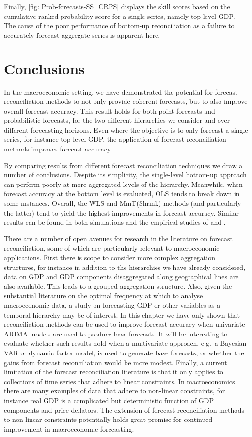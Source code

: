\documentclass[graybox]{svmult}
\begin{document}
Finally, \autoref{fig: Prob-forecasts-SS_CRPS} displays the skill scores based on the cumulative ranked probability score for a single series, namely top-level GDP\@. The cause of the poor performance of bottom-up reconciliation as a failure to accurately forecast aggregate series is apparent here.

\section{Conclusions}\label{sec:conclusions}

In the macroeconomic setting, we have demonstrated the potential for forecast reconciliation methods to not only provide coherent forecasts, but to also improve overall forecast accuracy. This result holds for both point forecasts and probabilistic forecasts, for the two different hierarchies we consider and over different forecasting horizons. Even where the objective is to only forecast a single series, for instance top-level GDP, the application of forecast reconciliation methods improves forecast accuracy.

By comparing results from different forecast reconciliation techniques we draw a number of conclusions. Despite its simplicity, the single-level bottom-up approach can perform poorly at more aggregated levels of the hierarchy. Meanwhile, when forecast accuracy at the bottom level is evaluated, OLS tends to break down in some instances. Overall, the WLS and MinT(Shrink) methods (and particularly the latter) tend to yield the highest improvements in forecast accuracy. Similar results can be found in both simulations and the empirical studies of \citet{AthEtAl2017} and \citet{WicEtAl2019}.

There are a number of open avenues for research in the literature on forecast reconciliation, some of which are particularly relevant to macroeconomic applications. First there is scope to consider more complex aggregation structures, for instance in addition to the hierarchies we have already considered, data on GDP and GDP components disaggregated along geographical lines are also available. This leads to a grouped aggregation structure. Also, given the substantial literature on the optimal frequency at which to analyse macroeconomic data, a study on forecasting GDP or other variables as a temporal hierarchy may be of interest. In this chapter we have only shown that reconciliation methods can be used to improve forecast accuracy when univariate ARIMA models are used to produce base forecasts. It will be interesting to evaluate whether such results hold when a multivariate approach, e.g.\ a Bayesian VAR or dynamic factor model, is used to generate base forecasts, or whether the gains from forecast reconciliation would be more modest. Finally, a current limitation of the forecast reconciliation literature is that it only applies to collections of time series that adhere to linear constraints. In macroeconomics there are many examples of data that adhere to non-linear constraints, for instance real GDP is a complicated but deterministic function of GDP components and price deflators. The extension of forecast reconciliation methods to non-linear constraints potentially holds great promise for continued improvement in macroeconomic forecasting.
\end{document}
